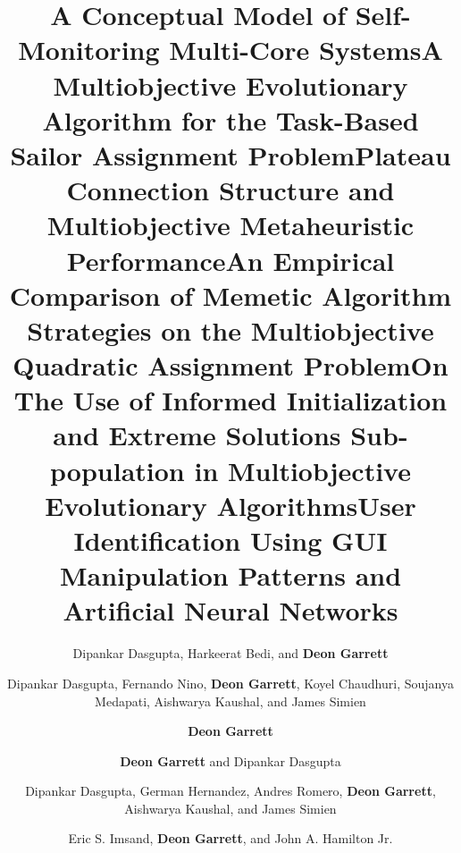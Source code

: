 \documentclass[a4paper,10pt]{cvclean}
\begin{document}
\begin{publications}
\begin{conferencepapers}
\begin{paper}
    \end{paper}
    \begin{paper}
      \title{A Conceptual Model of Self-Monitoring Multi-Core Systems}
      \author{Dipankar Dasgupta, Harkeerat Bedi, and \textbf{Deon Garrett}}
    \end{paper}
    \begin{paper}
      \title{A Multiobjective Evolutionary Algorithm for the Task-Based Sailor
        Assignment Problem}
      \author{Dipankar Dasgupta, Fernando Nino, \textbf{Deon Garrett}, Koyel Chaudhuri,
        Soujanya Medapati, Aishwarya Kaushal, and James Simien}
    \end{paper}
    \begin{paper}
      \title{Plateau Connection Structure and Multiobjective Metaheuristic
        Performance}
      \author{\textbf{Deon Garrett}}
    \end{paper}
    \begin{paper}
      \title{An Empirical Comparison of Memetic Algorithm Strategies on the
        Multiobjective Quadratic Assignment Problem}
      \author{\textbf{Deon Garrett} and Dipankar Dasgupta}
    \end{paper}
    \begin{paper}
      \title{On The Use of Informed Initialization and Extreme Solutions
        Sub-population in Multiobjective Evolutionary Algorithms}
      \author{Dipankar Dasgupta, German Hernandez, Andres Romero, \textbf{Deon Garrett},
        Aishwarya Kaushal, and James Simien}
    \end{paper}
    \begin{paper}
      \title{User Identification Using GUI Manipulation Patterns and Artificial
        Neural Networks}
      \author{Eric S. Imsand, \textbf{Deon Garrett}, and John A. Hamilton Jr.}

\end{paper}
\end{conferencepapers}
\end{publications}
\end{document}
